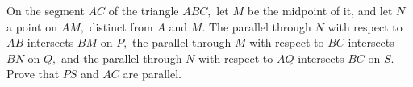 On the segment $ AC $ of the triangle $ ABC, $ let $ M $ be the midpoint of it, and let $ N $ a point on $ AM, $ distinct from $ A $ and $ M. $ The parallel through $ N $ with respect to $ AB $ intersects $ BM $ on $ P, $ the parallel through $ M $ with respect to $ BC $ intersects $ BN $ on $ Q, $ and the parallel through $ N $ with respect to $ AQ $ intersects $ BC $ on $ S. $
Prove that $ PS $ and $ AC $ are parallel.